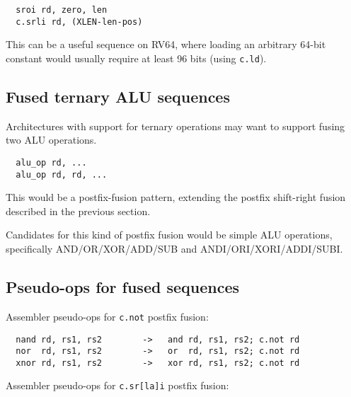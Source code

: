 \begin{minipage}{\linewidth}
\begin{verbatim}
  sroi rd, zero, len
  c.srli rd, (XLEN-len-pos)
\end{verbatim}
\end{minipage}

This can be a useful sequence on RV64, where loading an arbitrary 64-bit constant would usually
require at least 96 bits (using \texttt{c.ld}).


\subsection{Fused ternary ALU sequences}

Architectures with support for ternary operations may want to support fusing two ALU operations.

\begin{minipage}{\linewidth}
\begin{verbatim}
  alu_op rd, ...
  alu_op rd, rd, ...
\end{verbatim}
\end{minipage}

This would be a postfix-fusion pattern, extending the postfix shift-right
fusion described in the previous section.

Candidates for this kind of postfix fusion would be simple ALU operations, specifically
AND/OR/XOR/ADD/SUB and ANDI/ORI/XORI/ADDI/SUBI.


\subsection{Pseudo-ops for fused sequences}

Assembler pseudo-ops for {\tt c.not} postfix fusion:

\begin{minipage}{\linewidth}
\begin{verbatim}
  nand rd, rs1, rs2        ->   and rd, rs1, rs2; c.not rd
  nor  rd, rs1, rs2        ->   or  rd, rs1, rs2; c.not rd
  xnor rd, rs1, rs2        ->   xor rd, rs1, rs2; c.not rd
\end{verbatim}
\end{minipage}

Assembler pseudo-ops for {\tt c.sr[la]i} postfix fusion:

